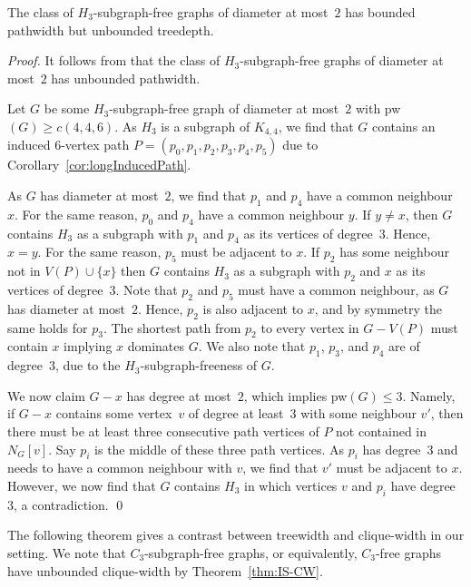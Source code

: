 \documentclass[runningheads,envcountsame]{llncs}
\newcommand{\Hgraph}[1]{H_{#1}}
\begin{document}
\begin{theorem}
    The class of $\Hgraph{3}$-subgraph-free graphs of diameter at most~$2$ has bounded pathwidth but unbounded treedepth. 
\end{theorem}
\begin{proof}
It follows from  that the class of
$\Hgraph{3}$-subgraph-free graphs of diameter at most~$2$ has unbounded pathwidth.

    Let $G$ be some $\Hgraph{3}$-subgraph-free graph of diameter at most~$2$ with pw$(G) \geq c(4,4,6)$. As $\Hgraph{3}$ is a subgraph of $K_{4,4}$, we find that $G$ contains an induced $6$-vertex path $P= (p_0,p_1,p_2,p_3,p_4,p_5)$ due to Corollary~\ref{cor:longInducedPath}.

    As $G$ has diameter at most~$2$,
    we find that $p_1$ and $p_4$ have a common neighbour~$x$. For the same reason,  $p_0$ and $p_4$ have a common neighbour $y$. If $y\neq x$, then $G$ contains $\Hgraph{3}$ as a subgraph with $p_1$ and $p_4$ as its vertices of degree~$3$. Hence, $x=y$. For the same reason, $p_5$ must be adjacent to $x$.
    If $p_2$ has some neighbour not in $V(P) \cup \{x\}$ then $G$ contains $\Hgraph{3}$ as a subgraph with $p_2$ and $x$ as its vertices of degree~$3$. Note that $p_2$ and $p_5$ must have a common neighbour, as $G$ has diameter at most~$2$. Hence, $p_2$ is also adjacent to $x$, and by symmetry the same holds for $p_3$. The shortest path from $p_2$ to every vertex in $G-V(P)$ must contain $x$ implying $x$ dominates $G$. We also note that $p_1$, $p_3$, and $p_4$ are of degree~$3$, due to the $\Hgraph{3}$-subgraph-freeness of $G$.
        
    We now claim $G-x$ has degree at most~$2$, which implies pw$(G) \leq 3$. Namely, if $G-x$ contains some vertex~$v$ of degree at least~$3$ with some neighbour $v'$, then there must be at least three consecutive path vertices of $P$ not contained in $N_G[v]$. Say $p_i$ is the middle of these three path vertices. As $p_i$ has degree~$3$ and needs to have a common neighbour with $v$, we find that $v'$ must be adjacent to $x$. However, we now find that $G$ contains $\Hgraph{3}$ in which vertices $v$ and $p_i$ have degree~$3$, a contradiction. \qed
\end{proof}

The following theorem gives a contrast between treewidth and clique-width in our setting. We note that $C_3$-subgraph-free graphs, or equivalently, $C_3$-free graphs have unbounded clique-width by Theorem~\ref{thm:IS-CW}.
\end{document}
